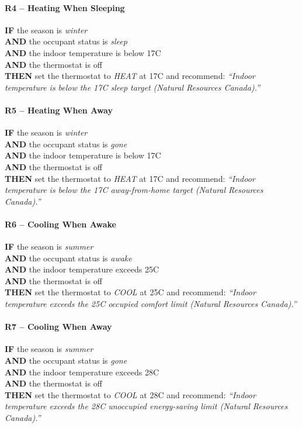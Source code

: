 \documentclass{article}
\begin{document}
\paragraph{R4 -- Heating When Sleeping}
\textbf{IF} the season is \emph{winter} \\
\textbf{AND} the occupant status is \emph{sleep} \\
\textbf{AND} the indoor temperature is below 17\textdegree C \\
\textbf{AND} the thermostat is off \\
\textbf{THEN} set the thermostat to \emph{HEAT} at 17\textdegree C and recommend: \textit{``Indoor temperature is below the 17\textdegree C sleep target (Natural Resources Canada).''}

\paragraph{R5 -- Heating When Away}
\textbf{IF} the season is \emph{winter} \\
\textbf{AND} the occupant status is \emph{gone} \\
\textbf{AND} the indoor temperature is below 17\textdegree C \\
\textbf{AND} the thermostat is off \\
\textbf{THEN} set the thermostat to \emph{HEAT} at 17\textdegree C and recommend: \textit{``Indoor temperature is below the 17\textdegree C away-from-home target (Natural Resources Canada).''}

\paragraph{R6 -- Cooling When Awake}
\textbf{IF} the season is \emph{summer} \\
\textbf{AND} the occupant status is \emph{awake} \\
\textbf{AND} the indoor temperature exceeds 25\textdegree C \\
\textbf{AND} the thermostat is off \\
\textbf{THEN} set the thermostat to \emph{COOL} at 25\textdegree C and recommend: \textit{``Indoor temperature exceeds the 25\textdegree C occupied comfort limit (Natural Resources Canada).''}

\paragraph{R7 -- Cooling When Away}
\textbf{IF} the season is \emph{summer} \\
\textbf{AND} the occupant status is \emph{gone} \\
\textbf{AND} the indoor temperature exceeds 28\textdegree C \\
\textbf{AND} the thermostat is off \\
\textbf{THEN} set the thermostat to \emph{COOL} at 28\textdegree C and recommend: \textit{``Indoor temperature exceeds the 28\textdegree C unoccupied energy-saving limit (Natural Resources Canada).''}
\end{document}
